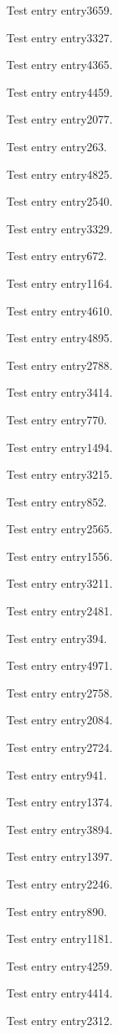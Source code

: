 Test entry \gls{entry3659}.

Test entry \gls{entry3327}.

Test entry \gls{entry4365}.

Test entry \gls{entry4459}.

Test entry \gls{entry2077}.

Test entry \gls{entry263}.

Test entry \gls{entry4825}.

Test entry \gls{entry2540}.

Test entry \gls{entry3329}.

Test entry \gls{entry672}.

Test entry \gls{entry1164}.

Test entry \gls{entry4610}.

Test entry \gls{entry4895}.

Test entry \gls{entry2788}.

Test entry \gls{entry3414}.

Test entry \gls{entry770}.

Test entry \gls{entry1494}.

Test entry \gls{entry3215}.

Test entry \gls{entry852}.

Test entry \gls{entry2565}.

Test entry \gls{entry1556}.

Test entry \gls{entry3211}.

Test entry \gls{entry2481}.

Test entry \gls{entry394}.

Test entry \gls{entry4971}.

Test entry \gls{entry2758}.

Test entry \gls{entry2084}.

Test entry \gls{entry2724}.

Test entry \gls{entry941}.

Test entry \gls{entry1374}.

Test entry \gls{entry3894}.

Test entry \gls{entry1397}.

Test entry \gls{entry2246}.

Test entry \gls{entry890}.

Test entry \gls{entry1181}.

Test entry \gls{entry4259}.

Test entry \gls{entry4414}.

Test entry \gls{entry2312}.

